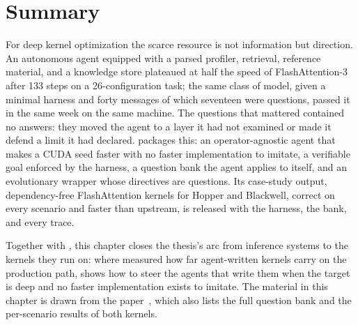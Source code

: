 \section{Summary}
\label{kernelseek:sec:summary}

For deep kernel optimization the scarce resource is not information but direction. An autonomous
agent equipped with a parsed profiler, retrieval, reference material, and a knowledge store
plateaued at half the speed of FlashAttention-3 after 133 steps on a 26-configuration task; the same
class of model, given a minimal harness and forty messages of which seventeen were questions, passed
it in the same week on the same machine. The questions that mattered contained no answers: they
moved the agent to a layer it had not examined or made it defend a limit it had declared.
\KernelSeek packages this: an operator-agnostic agent that makes a CUDA seed faster with no faster
implementation to imitate, a verifiable goal enforced by the harness, a question bank the agent
applies to itself, and an evolutionary wrapper whose directives are questions. Its case-study
output, dependency-free FlashAttention kernels for Hopper and Blackwell, correct on every scenario
and faster than upstream, is released with the harness, the bank, and every trace.

Together with \FastKernels, this chapter closes the thesis's arc from inference systems to the
kernels they run on: where \FastKernels measured how far agent-written kernels carry on the
production path, \KernelSeek shows how to steer the agents that write them when the target is
deep and no faster implementation exists to imitate. The material in this chapter is drawn from
the paper~\cite{kernelseek}, which also lists the full question bank and the per-scenario results of
both kernels.
